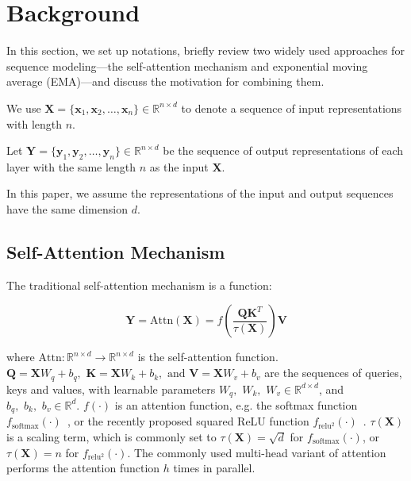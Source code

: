 \section{Background}
\label{sec:background}
In this section, we set up notations, briefly review two widely used approaches for sequence modeling---the self-attention mechanism and exponential moving average (EMA)---and discuss the motivation for combining them.

We use $\boldsymbol{X} = \{\mathbf{x}_1, \mathbf{x}_2, \ldots, \mathbf{x}_n\} \in \mathbb{R}^{n\times d}$ to denote a sequence of input representations with length $n$.

Let $\boldsymbol{Y} =\{\mathbf{y}_1, \mathbf{y}_2, \ldots, \mathbf{y}_n\} \in \mathbb{R}^{n\times d}$ be the sequence of output representations of each layer with the same length $n$ as the input $\boldsymbol{X}$.

In this paper, we assume the representations of the input and output sequences have the same dimension $d$. 

\subsection{Self-Attention Mechanism}
\label{subsec:attention}

The traditional self-attention mechanism is a function:

\begin{equation}\label{eq:attention}
\boldsymbol{Y} = \mathrm{Attn}(\boldsymbol{X}) = f\left( \frac{\boldsymbol{Q} \boldsymbol{K}^T}{\tau(\boldsymbol{X})} \right) \boldsymbol{V}
\end{equation}

where $\mathrm{Attn}: \mathbb{R}^{n\times d} \rightarrow \mathbb{R}^{n\times d}$ is the self-attention function.
$\boldsymbol{Q}=\boldsymbol{X}W_q + b_q, \,\, \boldsymbol{K} = \boldsymbol{X}W_k + b_k, \,\, \mbox{and~} \boldsymbol{V} = \boldsymbol{X}W_v + b_v$ are the sequences of queries, keys and values, with learnable parameters $W_q, \,\, W_k, \,\, W_v \in \mathbb{R}^{d\times d}$, and $b_q, \,\, b_k, \,\, b_v \in \mathbb{R}^{d}$. $f(\cdot)$ is an attention function, e.g. the softmax function $f_{\mathrm{softmax}}(\cdot)$~\citep{bahdanau2015neural}, or the recently proposed squared ReLU function $f_{\mathrm{relu^2}}(\cdot)$~\citep{so2021searching,hua2022transformer}.
$\tau(\boldsymbol{X})$ is a scaling term, which is commonly set to $\tau(\boldsymbol{X}) = \sqrt{d}$ for $f_{\mathrm{softmax}}(\cdot)$, or $\tau(\boldsymbol{X}) = n$ for $f_{\mathrm{relu^2}}(\cdot)$.
The commonly used multi-head variant of attention performs the attention function $h$ times in parallel.


